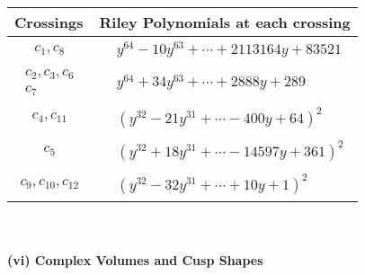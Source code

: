 \documentclass[1p]{elsarticle_modified}
\theoremstyle{definition}
\begin{document}
\begin{tabular}{m{50pt}|m{274pt}}
Crossings & \hspace{64pt}Riley Polynomials at each crossing \\
\hline $$\begin{aligned}c_{1},c_{8}\end{aligned}$$&$\begin{aligned}
&y^{64}-10 y^{63}+\cdots+2113164 y+83521
\end{aligned}$\\
\hline $$\begin{aligned}c_{2},c_{3},c_{6}\\c_{7}\end{aligned}$$&$\begin{aligned}
&y^{64}+34 y^{63}+\cdots+2888 y+289
\end{aligned}$\\
\hline $$\begin{aligned}c_{4},c_{11}\end{aligned}$$&$\begin{aligned}
&(y^{32}-21 y^{31}+\cdots-400 y+64)^{2}
\end{aligned}$\\
\hline $$\begin{aligned}c_{5}\end{aligned}$$&$\begin{aligned}
&(y^{32}+18 y^{31}+\cdots-14597 y+361)^{2}
\end{aligned}$\\
\hline $$\begin{aligned}c_{9},c_{10},c_{12}\end{aligned}$$&$\begin{aligned}
&(y^{32}-32 y^{31}+\cdots+10 y+1)^{2}
\end{aligned}$\\
\hline
\end{tabular}\\~\\
\newpage\flushleft \textbf{(vi) Complex Volumes and Cusp Shapes}
\end{document}

